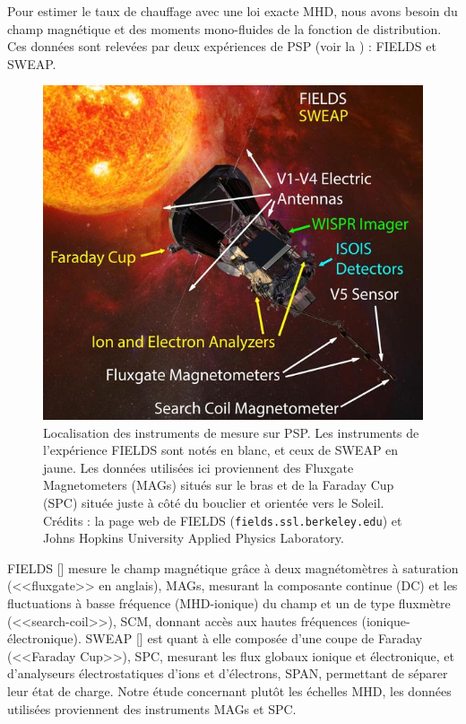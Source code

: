 Pour estimer le taux de chauffage avec une loi exacte \ac{MHD}, nous avons besoin du champ magnétique et des moments mono-fluides de la fonction de distribution. Ces données sont relevées par deux expériences de \ac{PSP} (voir la ) : \ac{FIELDS} et \ac{SWEAP}. 
\begin{figure}[!ht]
 \centering
\includegraphics[width=0.9\linewidth,trim=0cm 0cm 0cm 0cm, clip=false]{./Part_1/images/PSP_All_Instruments}
\cprotect\caption{Localisation des instruments de mesure sur \ac{PSP}. Les instruments de l'expérience \ac{FIELDS} sont notés en blanc, et ceux de \ac{SWEAP} en jaune. Les données utilisées ici proviennent des Fluxgate Magnetometers (\acs{MAGs}) situés sur le bras et de la Faraday Cup (\acs{SPC}) située juste à côté du bouclier et orientée vers le Soleil. Crédits : la page web de \ac{FIELDS} (\verb|fields.ssl.berkeley.edu|) et Johns Hopkins University Applied Physics Laboratory.}
\label{fig:sonde_PSP}
\end{figure}

\ac{FIELDS} [\cite{bale_fields_2016}] mesure le champ magnétique grâce à deux magnétomètres à saturation (<<fluxgate>> en anglais), \acs{MAGs}, mesurant la composante continue (DC) et les fluctuations à basse fréquence (MHD-ionique) du champ  et un de type fluxmètre (<<search-coil>>), \acs{SCM}, donnant accès aux hautes fréquences (ionique-électronique). \ac{SWEAP} [\cite{kasper_solar_2016}] est quant à elle composée d'une coupe de Faraday (<<Faraday Cup>>), \acs{SPC}, mesurant les flux globaux ionique et électronique, et d'analyseurs électrostatiques d'ions et d'électrons, \acs{SPAN}, permettant de séparer leur état de charge. Notre étude concernant plutôt les échelles MHD, les données utilisées proviennent des instruments \acs{MAGs} et \acs{SPC}. 

